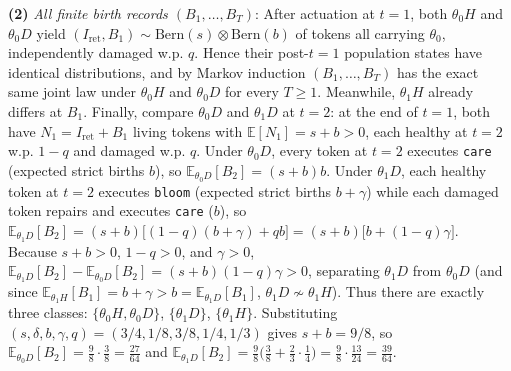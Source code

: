 \documentclass[11pt,a4paper]{article}
\begin{document}
\textbf{(2)} \emph{All finite birth records \((B_1,\dots,B_T)\)}: After
actuation at \(t=1\), both \(\theta_0 H\) and \(\theta_0 D\) yield
\((I_{\mathrm{ret}}, B_1) \sim \mathrm{Bern}(s) \otimes \mathrm{Bern}(b)\)
of tokens all carrying \(\theta_0\), independently damaged w.p. \(q\).
Hence their post-\(t=1\) population states have identical distributions,
and by Markov induction \((B_1, \dots, B_T)\) has the exact same joint
law under \(\theta_0 H\) and \(\theta_0 D\) for every \(T \ge 1\).
Meanwhile, \(\theta_1 H\) already differs at \(B_1\). Finally, compare
\(\theta_0 D\) and \(\theta_1 D\) at \(t=2\): at the end of \(t=1\),
both have \(N_1 = I_{\mathrm{ret}} + B_1\) living tokens with
\(\mathbb{E}[N_1] = s + b > 0\), each healthy at \(t=2\) w.p. \(1-q\)
and damaged w.p. \(q\). Under \(\theta_0 D\), every token at \(t=2\)
executes \texttt{care} (expected strict births \(b\)), so
\(\mathbb{E}_{\theta_0 D}[B_2] = (s+b)b\). Under \(\theta_1 D\), each
healthy token at \(t=2\) executes \texttt{bloom} (expected strict births
\(b+\gamma\)) while each damaged token repairs and executes
\texttt{care} (\(b\)), so
\(\mathbb{E}_{\theta_1 D}[B_2] = (s+b)\bigl[(1-q)(b+\gamma) + q b\bigr] = (s+b)\bigl[b + (1-q)\gamma\bigr]\).
Because \(s+b > 0\), \(1-q > 0\), and \(\gamma > 0\),
\(\mathbb{E}_{\theta_1 D}[B_2] - \mathbb{E}_{\theta_0 D}[B_2] = (s+b)(1-q)\gamma > 0\),
separating \(\theta_1 D\) from \(\theta_0 D\) (and since
\(\mathbb{E}_{\theta_1 H}[B_1] = b+\gamma > b = \mathbb{E}_{\theta_1 D}[B_1]\),
\(\theta_1 D \not\sim \theta_1 H\)). Thus there are exactly three
classes: \(\{\theta_0 H, \theta_0 D\}\), \(\{\theta_1 D\}\),
\(\{\theta_1 H\}\). Substituting
\((s,\delta,b,\gamma,q) = (3/4, 1/8, 3/8, 1/4, 1/3)\) gives
\(s+b = 9/8\), so
\(\mathbb{E}_{\theta_0 D}[B_2] = \frac{9}{8}\cdot\frac{3}{8} = \frac{27}{64}\)
and
\(\mathbb{E}_{\theta_1 D}[B_2] = \frac{9}{8}\bigl(\frac{3}{8} + \frac{2}{3}\cdot\frac{1}{4}\bigr) = \frac{9}{8}\cdot\frac{13}{24} = \frac{39}{64}\).
\end{document}
